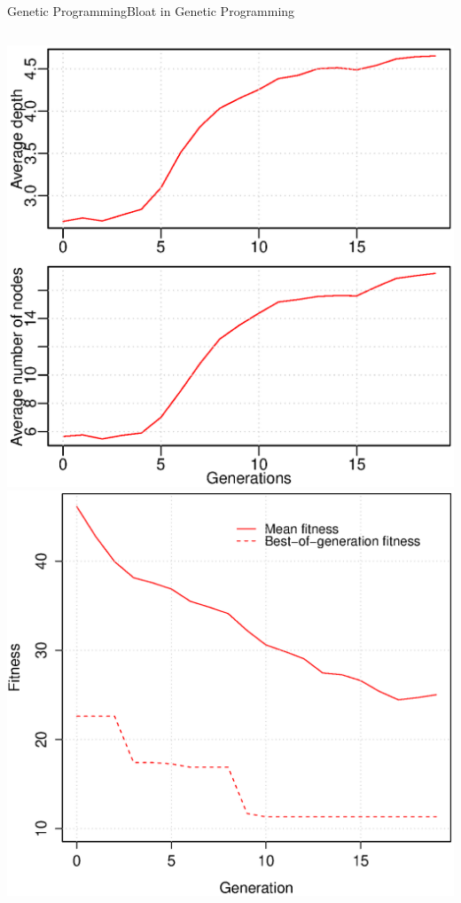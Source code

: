 \documentclass[10pt,compress]{beamer} %
\begin{document}
\begin{frame}{Genetic Programming}{Bloat in Genetic Programming}
\begin{columns}
		\begin{center}
			\includegraphics[width=\linewidth]{figs/depth-k2.eps}\\
			\includegraphics[width=\linewidth]{figs/fitness-k2.eps}
		\end{center}
	\end{columns}
\end{frame}
\end{document}
